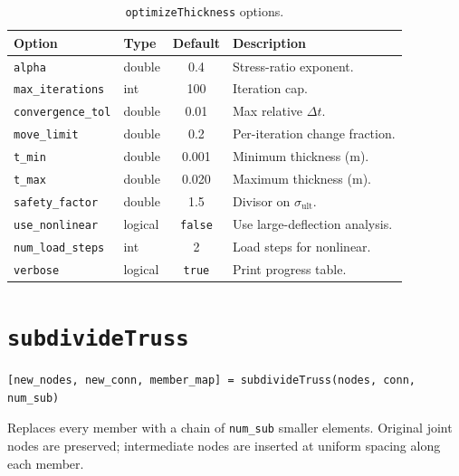 \begin{table}[H]
\centering
\caption{\texttt{optimizeThickness} options.}
\begin{tabularx}{\textwidth}{llcX}
\toprule
\textbf{Option} & \textbf{Type} & \textbf{Default} & \textbf{Description} \\
\midrule
\texttt{alpha}            & double  & 0.4     & Stress-ratio exponent. \\
\texttt{max\_iterations}  & int     & 100     & Iteration cap. \\
\texttt{convergence\_tol} & double  & 0.01    & Max relative $\Delta t$. \\
\texttt{move\_limit}      & double  & 0.2     & Per-iteration change fraction. \\
\texttt{t\_min}           & double  & 0.001   & Minimum thickness (m). \\
\texttt{t\_max}           & double  & 0.020   & Maximum thickness (m). \\
\texttt{safety\_factor}   & double  & 1.5     & Divisor on $\sigma_{\text{ult}}$. \\
\texttt{use\_nonlinear}   & logical & \texttt{false} & Use large-deflection analysis. \\
\texttt{num\_load\_steps} & int     & 2       & Load steps for nonlinear. \\
\texttt{verbose}          & logical & \texttt{true}  & Print progress table. \\
\bottomrule
\end{tabularx}
\end{table}

\section{\texttt{subdivideTruss}}
\label{sec:api:subdivide}

\begin{lstlisting}
[new_nodes, new_conn, member_map] = subdivideTruss(nodes, conn, num_sub)
\end{lstlisting}

Replaces every member with a chain of \texttt{num\_sub} smaller elements.
Original joint nodes are preserved; intermediate nodes are inserted at
uniform spacing along each member.

